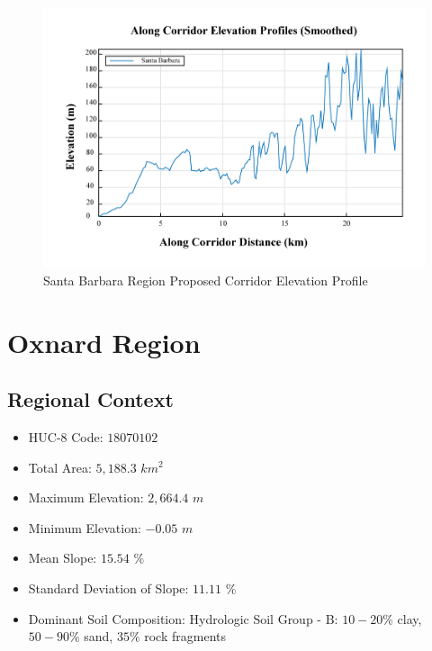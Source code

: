         \begin{figure}[!h]
            \begin{center}
            \includegraphics[width=5.5in]{figures/SantaBarbara_Elevation_Profile.png}   
            \caption{Santa Barbara Region Proposed Corridor Elevation Profile}
            \label{fig:SBelevationProfile}
            \end{center}
        \end{figure}
        
\clearpage
    
\section{Oxnard Region}

    \subsection{Regional Context}
    
    \begin{itemize}
      \setlength{\itemsep}{0cm}
      \setlength{\parskip}{0cm}
        \item HUC-8 Code: $18070102$
        \item Total Area: $5,188.3$ $km^2$
        \item Maximum Elevation: $2,664.4$ $m$
        \item Minimum Elevation: $-0.05$ $m$
        \item Mean Slope: $15.54$ $\%$
        \item Standard Deviation of Slope: $11.11$ $\%$
        \item Dominant Soil Composition: Hydrologic Soil Group - B: $10-20\%$ clay, $50-90\%$ sand, $35\%$ rock fragments
    \end{itemize}
    
